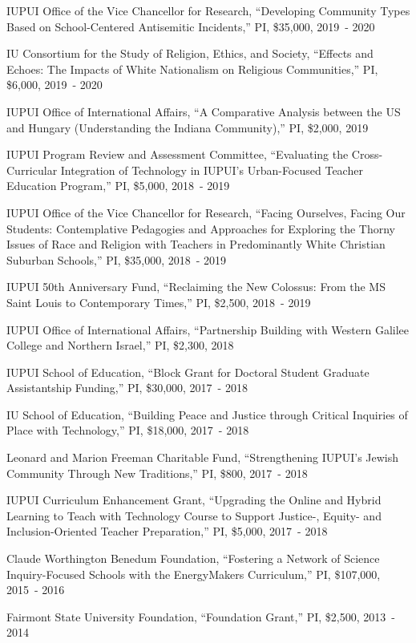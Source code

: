 \documentclass[11pt,article,oneside]{memoir}
\begin{document}
      \ind IUPUI Office of the Vice Chancellor for Research, ``Developing Community Types Based on School-Centered Antisemitic Incidents,'' PI, \$35,000, 2019~- 2020

      \ind IU Consortium for the Study of Religion, Ethics, and Society, ``Effects and Echoes: The Impacts of White Nationalism on Religious Communities,'' PI, \$6,000, 2019~- 2020

      \ind IUPUI Office of International Affairs, ``A Comparative Analysis between the US and Hungary (Understanding the Indiana Community),'' PI, \$2,000, 2019

      \ind IUPUI Program Review and Assessment Committee, ``Evaluating the Cross-Curricular Integration of Technology in IUPUI's Urban-Focused Teacher Education Program,'' PI, \$5,000, 2018~- 2019

      \ind IUPUI Office of the Vice Chancellor for Research, ``Facing Ourselves, Facing Our Students: Contemplative Pedagogies and Approaches for Exploring the Thorny Issues of Race and Religion with Teachers in Predominantly White Christian Suburban Schools,'' PI, \$35,000, 2018~- 2019

      \ind IUPUI 50th Anniversary Fund, ``Reclaiming the New Colossus: From the MS Saint Louis to Contemporary Times,'' PI, \$2,500, 2018~- 2019

      \ind IUPUI Office of International Affairs, ``Partnership Building with Western Galilee College and Northern Israel,'' PI, \$2,300, 2018

      \ind IUPUI School of Education, ``Block Grant for Doctoral Student Graduate Assistantship Funding,'' PI, \$30,000, 2017~- 2018

      \ind IU School of Education, ``Building Peace and Justice through Critical Inquiries of Place with Technology,'' PI, \$18,000, 2017~- 2018

      \ind Leonard and Marion Freeman Charitable Fund, ``Strengthening IUPUI's Jewish Community Through New Traditions,'' PI, \$800, 2017~- 2018

      \ind IUPUI Curriculum Enhancement Grant, ``Upgrading the Online and Hybrid Learning to Teach with Technology Course to Support Justice-, Equity- and Inclusion-Oriented Teacher Preparation,'' PI, \$5,000, 2017~- 2018

      \ind Claude Worthington Benedum Foundation, ``Fostering a Network of Science Inquiry-Focused Schools with the EnergyMakers Curriculum,'' PI, \$107,000, 2015~- 2016

      \ind Fairmont State University Foundation, ``Foundation Grant,'' PI, \$2,500, 2013~- 2014
\end{document}
